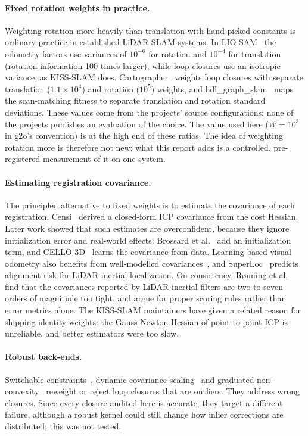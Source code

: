 \documentclass[11pt,a4paper]{article}
\begin{document}
\paragraph{Fixed rotation weights in practice.} Weighting rotation more heavily than translation with hand-picked
constants is ordinary practice in established LiDAR SLAM systems. In LIO-SAM~\cite{liosam} the odometry factors
use variances of $10^{-6}$ for rotation and $10^{-4}$ for translation (rotation information 100 times larger),
while loop closures use an isotropic variance, as KISS-SLAM does. Cartographer~\cite{cartographer} weights loop
closures with separate translation ($1.1\times10^4$) and rotation ($10^5$) weights, and
hdl\_graph\_slam~\cite{hdlgraphslam} maps the scan-matching fitness to separate translation and rotation standard
deviations. These values come from the projects' source configurations; none of the projects publishes an
evaluation of the choice. The value used here ($W=10^3$ in g2o's convention) is at the high end of these ratios.
The idea of weighting rotation more is therefore not new; what this report adds is a controlled, pre-registered
measurement of it on one system.

\paragraph{Estimating registration covariance.} The principled alternative to fixed weights is to estimate the
covariance of each registration. Censi~\cite{censi2007} derived a closed-form ICP covariance from the cost
Hessian. Later work showed that such estimates are overconfident, because they ignore initialization error and
real-world effects: Brossard et al.~\cite{brossard2020} add an initialization term, and CELLO-3D~\cite{cello3d}
learns the covariance from data. Learning-based visual odometry also benefits from well-modelled
covariances~\cite{macvo}, and SuperLoc~\cite{superloc} predicts alignment risk for LiDAR-inertial localization.
On consistency, R{\o}nning et al.~\cite{ronning2026} find that the covariances reported by LiDAR-inertial filters
are two to seven orders of magnitude too tight, and argue for proper scoring rules rather than error metrics
alone. The KISS-SLAM maintainers have given a related reason for shipping identity weights: the Gauss-Newton
Hessian of point-to-point ICP is unreliable, and better estimators were too slow.

\paragraph{Robust back-ends.} Switchable constraints~\cite{switchable}, dynamic covariance
scaling~\cite{dcs} and graduated non-convexity~\cite{gnc} reweight or reject loop closures that are outliers.
They address wrong closures. Since every closure audited here is accurate, they target a different failure,
although a robust kernel could still change how inlier corrections are distributed; this was not tested.
\end{document}
